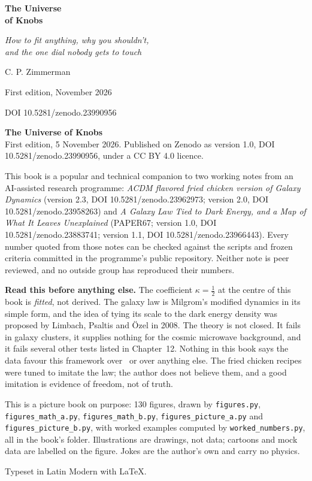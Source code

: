\begin{titlepage}
\centering
\vspace*{1.2in}
{\Huge\bfseries\color{knobink} The Universe\\[6pt] of Knobs\par}
\vspace{18pt}
{\large\itshape How to fit anything, why you shouldn't,\\ and the one dial nobody gets to touch\par}
\vspace{1.1in}
{\large C. P. Zimmerman\par}
\vfill
{\small First edition, November 2026\par}
{\small DOI 10.5281/zenodo.23990956\par}
\end{titlepage}

\thispagestyle{empty}
\vspace*{\fill}
{\small
\noindent\textbf{The Universe of Knobs}\\
First edition, 5 November 2026. Published on Zenodo as version 1.0, DOI 10.5281/zenodo.23990956, under a CC BY 4.0 licence.

\medskip\noindent
This book is a popular and technical companion to two working notes from an AI-assisted research programme: \emph{ACDM flavored fried chicken version of Galaxy Dynamics} (version 2.3, DOI 10.5281/zenodo.23962973; version 2.0, DOI 10.5281/zenodo.23958263) and \emph{A Galaxy Law Tied to Dark Energy, and a Map of What It Leaves Unexplained} (PAPER67; version 1.0, DOI 10.5281/zenodo.23883741; version 1.1, DOI 10.5281/zenodo.23966443). Every number quoted from those notes can be checked against the scripts and frozen criteria committed in the programme's public repository. Neither note is peer reviewed, and no outside group has reproduced their numbers.

\medskip\noindent
\textbf{Read this before anything else.} The coefficient $\kappa=\tfrac12$ at the centre of this book is \emph{fitted}, not derived. The galaxy law is Milgrom's modified dynamics in its simple form, and the idea of tying its scale to the dark energy density was proposed by Limbach, Psaltis and \"Ozel in 2008. The theory is not closed. It fails in galaxy clusters, it supplies nothing for the cosmic microwave background, and it fails several other tests listed in Chapter~12. Nothing in this book says the data favour this framework over \LCDM\ or over anything else. The fried chicken recipes were tuned to imitate the law; the author does not believe them, and a good imitation is evidence of freedom, not of truth.

\medskip\noindent
This is a picture book on purpose: 130 figures, drawn by \texttt{figures.py}, \texttt{figures\_math\_a.py}, \texttt{figures\_math\_b.py}, \texttt{figures\_picture\_a.py} and \texttt{figures\_picture\_b.py}, with worked examples computed by \texttt{worked\_numbers.py}, all in the book's folder. Illustrations are drawings, not data; cartoons and mock data are labelled on the figure. Jokes are the author's own and carry no physics.

\medskip\noindent
Typeset in Latin Modern with \LaTeX.
}
\vspace*{\fill}
\clearpage
